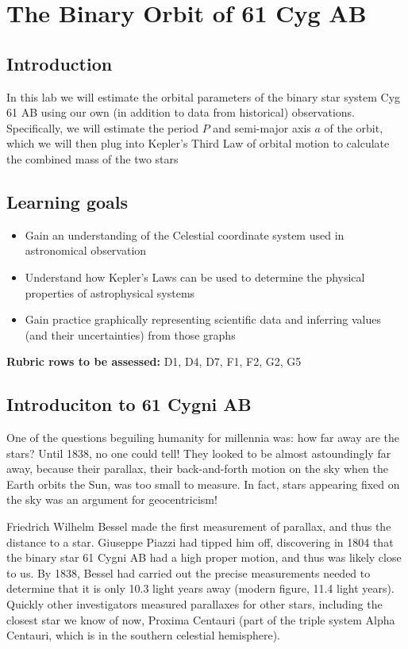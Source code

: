 \chapter{The Binary Orbit of 61 Cyg AB}

\section{Introduction}

In this lab we will estimate the orbital parameters of the binary star system Cyg 61 AB using our own (in addition to data from historical) observations. Specifically, we will estimate the period $P$ and semi-major axis $a$ of the orbit, which we will then plug into Kepler's Third Law of orbital motion to calculate the combined mass of the two stars

\section{Learning goals}

\begin{itemize}
\item Gain an understanding of the Celestial coordinate system used in astronomical observation
\item Understand how Kepler's Laws can be used to determine the physical properties of astrophysical systems
\item Gain practice graphically representing scientific data and inferring values (and their uncertainties) from those graphs
\end{itemize}

\textbf{Rubric rows to be assessed:} D1, D4, D7, F1, F2, G2, G5

\section{Introduciton to 61 Cygni AB}
One of the questions beguiling humanity for millennia was: how far away are the stars?  Until 1838, no one could tell!  They looked to be almost astoundingly far away, because their parallax, their back-and-forth motion on the sky when the Earth orbits the Sun, was too small to measure.  In fact, stars appearing fixed on the sky was an argument for geocentricism!

Friedrich Wilhelm Bessel made the first measurement of parallax, and thus the distance to a star. Giuseppe Piazzi had tipped him off, discovering in 1804 that the binary star 61 Cygni AB had a high proper motion, and thus was likely close to us. By 1838, Bessel had carried out the precise measurements needed to determine that it is only 10.3 light years away (modern figure, 11.4 light years).  Quickly other investigators measured parallaxes for other stars, including the closest star we know of now, Proxima Centauri (part of the triple system Alpha Centauri, which is in the southern celestial hemisphere).  %

